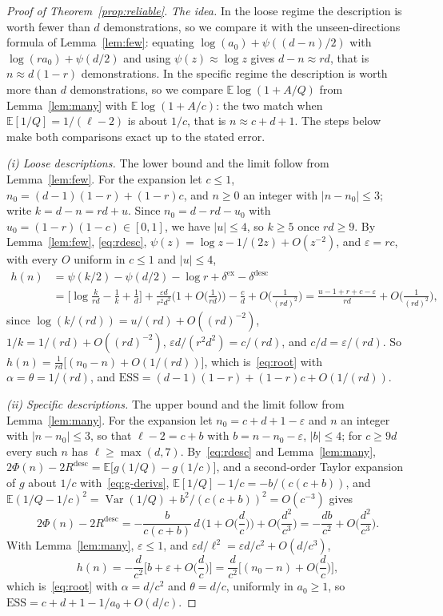 \documentclass{article}
\newcommand{\ess}{\mathrm{ESS}}
\newcommand{\E}{\mathbb{E}}
\begin{document}
\begin{proof}[Proof of Theorem~\ref{prop:reliable}]
\emph{The idea.} In the loose regime the description is worth fewer than $d$ demonstrations, so we compare it with the unseen-directions formula of Lemma~\ref{lem:few}: equating $\log(a_0) + \psi((d - n)/2)$ with $\log(r a_0) + \psi(d/2)$ and using $\psi(z) \approx \log z$ gives $d - n \approx rd$, that is $n \approx d(1-r)$ demonstrations. In the specific regime the description is worth more than $d$ demonstrations, so we compare $\E\log(1 + A/Q)$ from Lemma~\ref{lem:many} with $\E\log(1 + A/c)$: the two match when $\E[1/Q] = 1/(\ell - 2)$ is about $1/c$, that is $n \approx c + d + 1$. The steps below make both comparisons exact up to the stated error.

\emph{(i) Loose descriptions.} The lower bound and the limit follow from Lemma~\ref{lem:few}. For the expansion let $c \le 1$, $n_0 = (d-1)(1-r) + (1-r)c$, and $n \ge 0$ an integer with $|n - n_0| \le 3$; write $k = d - n = rd + u$. Since $n_0 = d - rd - u_0$ with $u_0 = (1-r)(1-c) \in [0, 1]$, we have $|u| \le 4$, so $k \ge 5$ once $rd \ge 9$. By Lemma~\ref{lem:few}, \eqref{eq:rdesc}, $\psi(z) = \log z - 1/(2z) + O(z^{-2})$, and $\varepsilon = rc$, with every $O$ uniform in $c \le 1$ and $|u| \le 4$,
\begin{align*}
h(n) &= \psi(k/2) - \psi(d/2) - \log r + \delta^{\mathrm{ex}} - \delta^{\mathrm{desc}} \\
&= \Big[\log\frac{k}{rd} - \frac1k + \frac1d\Big] + \frac{\varepsilon d}{r^2 d^2}\Big(1 + O\Big(\frac{1}{rd}\Big)\Big) - \frac{c}{d} + O\Big(\frac{1}{(rd)^2}\Big)
 = \frac{u - 1 + r + c - \varepsilon}{rd} + O\Big(\frac{1}{(rd)^2}\Big),
\end{align*}
since $\log(k/(rd)) = u/(rd) + O((rd)^{-2})$, $1/k = 1/(rd) + O((rd)^{-2})$, $\varepsilon d / (r^2 d^2) = c/(rd)$, and $c/d = \varepsilon/(rd)$. So $h(n) = \frac{1}{rd}\big[(n_0 - n) + O(1/(rd))\big]$, which is~\eqref{eq:root} with $\alpha = \theta = 1/(rd)$, and $\ess = (d-1)(1-r) + (1-r)c + O(1/(rd))$.

\emph{(ii) Specific descriptions.} The upper bound and the limit follow from Lemma~\ref{lem:many}. For the expansion let $n_0 = c + d + 1 - \varepsilon$ and $n$ an integer with $|n - n_0| \le 3$, so that $\ell - 2 = c + b$ with $b = n - n_0 - \varepsilon$, $|b| \le 4$; for $c \ge 9d$ every such $n$ has $\ell \ge \max(d, 7)$. By~\eqref{eq:rdesc} and Lemma~\ref{lem:many}, $2\Phi(n) - 2R^{\mathrm{desc}} = \E\big[g(1/Q) - g(1/c)\big]$, and a second-order Taylor expansion of $g$ about $1/c$ with~\eqref{eq:g-derivs}, $\E[1/Q] - 1/c = -b/(c(c+b))$, and $\E(1/Q - 1/c)^2 = \operatorname{Var}(1/Q) + b^2/(c(c+b))^2 = O(c^{-3})$ gives
\[
2\Phi(n) - 2R^{\mathrm{desc}} = -\frac{b}{c(c+b)}\,d\,\Big(1 + O\Big(\frac dc\Big)\Big) + O\Big(\frac{d^2}{c^3}\Big) = -\frac{db}{c^2} + O\Big(\frac{d^2}{c^3}\Big).
\]
With Lemma~\ref{lem:many}, $\varepsilon \le 1$, and $\varepsilon d/\ell^2 = \varepsilon d/c^2 + O(d/c^3)$,
\[
h(n) = -\frac{d}{c^2}\Big[b + \varepsilon + O\Big(\frac{d}{c}\Big)\Big] = \frac{d}{c^2}\Big[(n_0 - n) + O\Big(\frac{d}{c}\Big)\Big],
\]
which is~\eqref{eq:root} with $\alpha = d/c^2$ and $\theta = d/c$, uniformly in $a_0 \ge 1$, so $\ess = c + d + 1 - 1/a_0 + O(d/c)$.


\end{proof}
\end{document}
